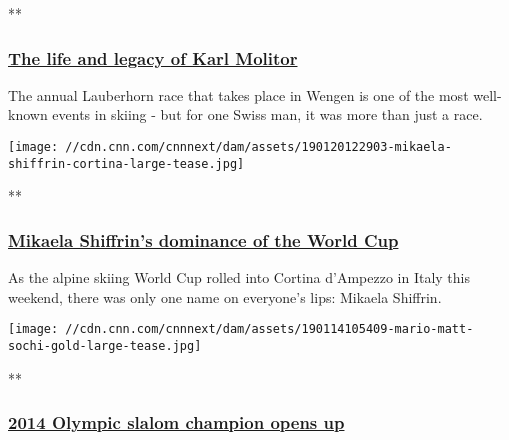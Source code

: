 **

\hypertarget{the-life-and-legacy-of-karl-molitor}{%
\subsubsection{\texorpdfstring{\href{/videos/sports/2019/01/21/karl-molitor-switzerland-skiing-legend-lauberhorn-alpine-edge-vision-spt-intl.cnn}{The
life and legacy of Karl
Molitor}}{The life and legacy of Karl Molitor}}\label{the-life-and-legacy-of-karl-molitor}}

The annual Lauberhorn race that takes place in Wengen is one of the most
well-known events in skiing - but for one Swiss man, it was more than
just a race.

\href{/videos/sports/2019/01/21/mikaela-shiffrin-dominance-cortina-world-cup-ester-ledecka-alpine-edge-vision-spt-intl.cnn}{}

\texttt{[image: //cdn.cnn.com/cnnnext/dam/assets/190120122903-mikaela-shiffrin-cortina-large-tease.jpg]}

**

\hypertarget{mikaela-shiffrins-dominance-of-the-world-cup}{%
\subsubsection{\texorpdfstring{\href{/videos/sports/2019/01/21/mikaela-shiffrin-dominance-cortina-world-cup-ester-ledecka-alpine-edge-vision-spt-intl.cnn}{Mikaela
Shiffrin's dominance of the World
Cup}}{Mikaela Shiffrin's dominance of the World Cup}}\label{mikaela-shiffrins-dominance-of-the-world-cup}}

As the alpine skiing World Cup rolled into Cortina d'Ampezzo in Italy
this weekend, there was only one name on everyone's lips: Mikaela
Shiffrin.

\href{/videos/sports/2019/01/14/mario-matt-austria-retired-skier-sochi-slalom-alpine-edge-vision-spt-intl.cnn}{}

\texttt{[image: //cdn.cnn.com/cnnnext/dam/assets/190114105409-mario-matt-sochi-gold-large-tease.jpg]}

**

\hypertarget{2014-olympic-slalom-champion-opens-up}{%
\subsubsection{\texorpdfstring{\href{/videos/sports/2019/01/14/mario-matt-austria-retired-skier-sochi-slalom-alpine-edge-vision-spt-intl.cnn}{2014
Olympic slalom champion opens
up}}{2014 Olympic slalom champion opens up}}\label{2014-olympic-slalom-champion-opens-up}}

